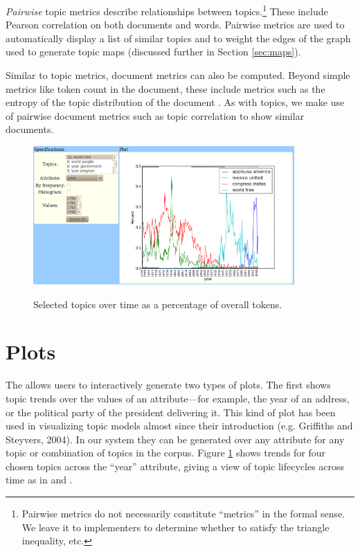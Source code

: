 \documentclass[11pt]{article}
\newcommand{\comments}[1]{}
\begin{document}
\textit{Pairwise} topic metrics describe relationships between
topics.\footnote{Pairwise metrics do not necessarily constitute
``metrics'' in the formal sense. We leave it to implementers to determine
whether to satisfy the triangle inequality, etc.} These include Pearson correlation on both documents and words.
Pairwise metrics are used to automatically display a list of similar topics and to weight
the edges of the graph used to generate topic maps (discussed further in Section
\ref{sec:maps}).

Similar to topic metrics, document metrics can also be computed.
Beyond simple metrics like token count in the document, these include
metrics such as the entropy of the topic distribution of the document \cite{Misra2008}. As
with topics, we make use of pairwise document metrics such as topic
correlation \cite{Blei2009} to show similar documents.

\begin{figure}[t]
 \centering
 \includegraphics[height=200px,keepaspectratio=true]{./topics_vs_years.png}
 \label{fig:chart}
 \caption{Selected topics over time as a percentage of overall tokens.}
\end{figure}

\section{Plots}\label{sec:plots}
The \tool{} allows users to interactively generate two types of plots. The first
shows topic trends over the values of an attribute---for example, the year
of an address, or the political party of the president delivering it. This kind
of plot has been used in visualizing topic models almost since their
introduction (e.g. Griffiths and Steyvers, 2004)\comments{\cite{Griffiths2004}}. %
In our system they can be generated over any attribute for any
topic or combination of topics in the corpus. Figure \ref{fig:chart} shows
trends for four chosen topics across the ``year'' attribute, giving a view
of topic lifecycles across time as in  and .
\end{document}

